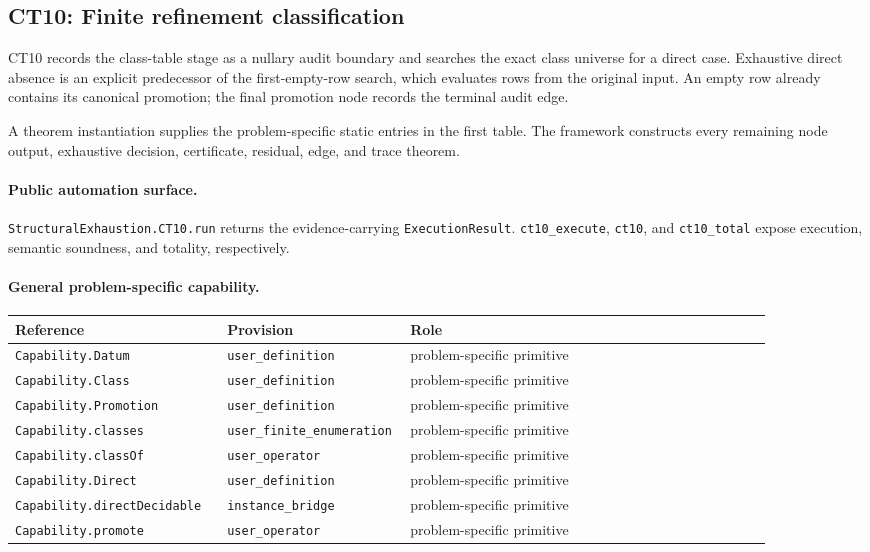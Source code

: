 \subsection{CT10: Finite refinement classification}
\label{sec:ct10-automation}

CT10 records the class-table stage as a nullary audit boundary and searches the exact class universe for a direct case. Exhaustive direct absence is an explicit predecessor of the first-empty-row search, which evaluates rows from the original input. An empty row already contains its canonical promotion; the final promotion node records the terminal audit edge.

A theorem instantiation supplies the problem-specific static entries in the first table. The framework constructs every remaining node output, exhaustive decision, certificate, residual, edge, and trace theorem.

\paragraph{Public automation surface.}
\texttt{StructuralExhaustion.CT10.run} returns the evidence-carrying \texttt{ExecutionResult}. \texttt{ct10\_\allowbreak{}execute}, \texttt{ct10}, and \texttt{ct10\_\allowbreak{}total} expose execution, semantic soundness, and totality, respectively.

\paragraph{General problem-specific capability.}
\begingroup\small
\begin{longtable}{@{}p{0.27\linewidth}p{0.15\linewidth}p{0.46\linewidth}@{}}
\toprule
Reference & Provision & Role \\
\midrule
\endhead
\texttt{Capability.\allowbreak{}Datum} & \texttt{user\_\allowbreak{}definition} & problem-specific primitive \\
\texttt{Capability.\allowbreak{}Class} & \texttt{user\_\allowbreak{}definition} & problem-specific primitive \\
\texttt{Capability.\allowbreak{}Promotion} & \texttt{user\_\allowbreak{}definition} & problem-specific primitive \\
\texttt{Capability.\allowbreak{}classes} & \texttt{user\_\allowbreak{}finite\_\allowbreak{}enumeration} & problem-specific primitive \\
\texttt{Capability.\allowbreak{}class\allowbreak{}Of} & \texttt{user\_\allowbreak{}operator} & problem-specific primitive \\
\texttt{Capability.\allowbreak{}Direct} & \texttt{user\_\allowbreak{}definition} & problem-specific primitive \\
\texttt{Capability.\allowbreak{}direct\allowbreak{}Decidable} & \texttt{instance\_\allowbreak{}bridge} & problem-specific primitive \\
\texttt{Capability.\allowbreak{}promote} & \texttt{user\_\allowbreak{}operator} & problem-specific primitive \\
\bottomrule
\end{longtable}
\endgroup

